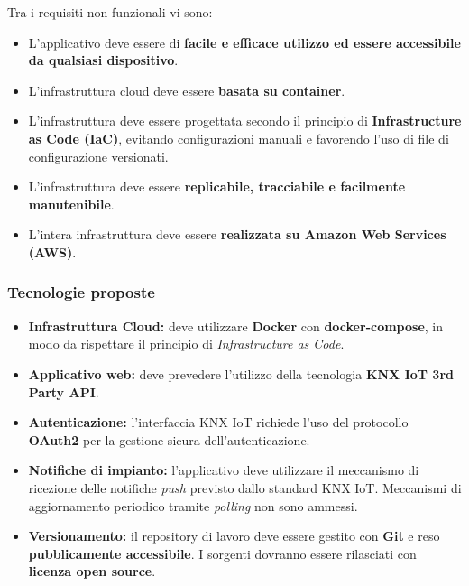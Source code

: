 \documentclass[a4paper,11pt]{article}
\begin{document}
Tra i requisiti non funzionali vi sono:
\begin{itemize}
    \item L'applicativo deve essere di \textbf{facile e efficace utilizzo ed essere accessibile da qualsiasi dispositivo}.
    \item L'infrastruttura cloud deve essere \textbf{basata su container}.
    \item L'infrastruttura deve essere progettata secondo il principio di \textbf{Infrastructure as Code (IaC)}, evitando configurazioni manuali e favorendo l'uso di file di configurazione versionati.
    \item L'infrastruttura deve essere \textbf{replicabile, tracciabile e facilmente manutenibile}.
    \item L'intera infrastruttura deve essere \textbf{realizzata su Amazon Web Services (AWS)}.
\end{itemize}

\subsubsection{Tecnologie proposte}
\begin{itemize}
  \item \textbf{Infrastruttura Cloud:} deve utilizzare \textbf{Docker} con \textbf{docker-compose}, in modo da rispettare il principio di \textit{Infrastructure as Code}.
  \item \textbf{Applicativo web:} deve prevedere l'utilizzo della tecnologia \textbf{KNX IoT 3rd Party API}.
  \item \textbf{Autenticazione:} l'interfaccia KNX IoT richiede l'uso del protocollo \textbf{OAuth2} per la gestione sicura dell'autenticazione.
  \item \textbf{Notifiche di impianto:} l'applicativo deve utilizzare il meccanismo di ricezione delle notifiche \textit{push} previsto dallo standard KNX IoT.  
  Meccanismi di aggiornamento periodico tramite \textit{polling} non sono ammessi.
  \item \textbf{Versionamento:} il repository di lavoro deve essere gestito con \textbf{Git} e reso \textbf{pubblicamente accessibile}.  
  I sorgenti dovranno essere rilasciati con \textbf{licenza open source}.
\end{itemize}
\end{document}
